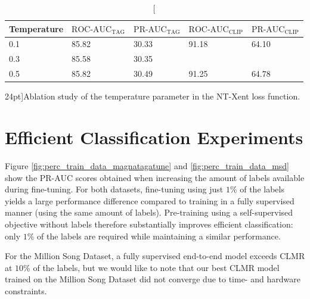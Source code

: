 \begin{table}
    \centering
    \begin{tabular}{lllll}\toprule
    Temperature & $\text{ROC-AUC}_{\text{TAG}}$ & $\text{PR-AUC}_{\text{TAG}}$ & $\text{ROC-AUC}_{\text{CLIP}}$ & $\text{PR-AUC}_{\text{CLIP}}$ \\\midrule
    0.1         & 85.82                         & 30.33                        & 91.18                          & 64.10                         \\
    0.3         & 85.58                         & 30.35                        &                                &                               \\
    0.5         & 85.82                         & 30.49                        & 91.25                          & 64.78 \\                       
    \bottomrule
    \end{tabular}
    \caption[][24pt]{Ablation study of the temperature parameter in the NT-Xent loss function.}
    \label{tab:temperature_ablation}
\end{table}


\section{Efficient Classification Experiments}
Figure \ref{fig:perc_train_data_magnatagatune} and \ref{fig:perc_train_data_msd} show the PR-AUC scores obtained when increasing the amount of labels available during fine-tuning.
For both datasets, fine-tuning using just $1\%$ of the labels yields a large performance difference compared to training in a fully supervised manner (using the same amount of labels).
Pre-training using a self-supervised objective without labels therefore substantially improves efficient classification: only $1\%$ of the labels are required while maintaining a similar performance.

For the Million Song Dataset, a fully supervised end-to-end model exceeds CLMR at $10\%$ of the labels, but we would like to note that our best CLMR model trained on the Million Song Dataset did not converge due to time- and hardware constraints.

